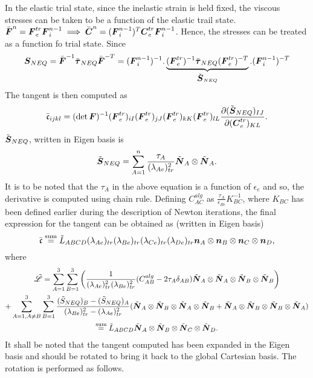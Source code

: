 \documentclass[11pt,twoside,TimesRoman]{article}
\newcommand{\parder}[2]{{\dfrac{\partial #1}{\partial #2}}}
\begin{document}
In the elastic trial state, since the inelastic strain is held fixed, the viscous stresses can be taken to be a function of the elastic trail state. $\bar{\mbox{\boldmath $F$}}^n =\mbox{\boldmath $F$}_e^{tr} \mbox{\boldmath $F$}_i^{n-1} \implies \bar{\mbox{\boldmath $C$}}^n = (\mbox{\boldmath $F$}_i^{n-1})^T \mbox{\boldmath $C$}_e^{tr} \mbox{\boldmath $F$}_i^{n-1}$. Hence, the stresses can be treated as a function fo trial state. Since
\begin{equation}
	 \mbox{\boldmath $S$}_{NEQ}  = \bar{\mbox{\boldmath $F$}}^{-1} \bar{\mbox{\boldmath $\tau$}}_{NEQ} \bar{\mbox{\boldmath $F$}}^{-T} = (\mbox{\boldmath $F$}_i^{n-1})^{-1}.	 \underbrace{(\mbox{\boldmath $F$}_e^{tr})^{-1} \bar{\mbox{\boldmath $\tau$}}_{NEQ} (\mbox{\boldmath $F$}_e^{tr})^{-T}}_{\tilde{\mbox{\boldmath $S$}}_{NEQ}}  .(\mbox{\boldmath $F$}_i^{n-1})^{-T}
\end{equation}
The tangent is then computed as 
\begin{equation}
	\bar{\mathfrak{c}}_{ijkl} = (\det \bfF)^{-1} (\bfF_e^{tr})_{iI} (\bfF_e^{tr})_{jJ} (\bfF_e^{tr})_{kK} (\bfF_e^{tr})_{lL} \parder{(\tilde{\bfS}_{NEQ})_{IJ}}{(\bfC_e^{tr})_{KL}}.
\end{equation}
$\tilde{\mbox{\boldmath $S$}}_{NEQ}$, written in Eigen basis is
\begin{equation}
	\tilde{\mbox{\boldmath $S$}}_{NEQ} = \sum_{A=1}^{n} \frac{\tau_A}{(\lambda_{Ae})_{tr}^2} \tilde{\mbox{\boldmath $N$}}_A \otimes \tilde{\mbox{\boldmath $N$}}_A.
\end{equation}
It is to be noted that the $\tau_A$ in the above equation is a function of $\epsilon_e$ and so, the derivative is computed using chain rule. Defining $C^{alg}_{AC}$ as $\frac{\tau_A}{\epsilon_{Be}} K_{BC}^{-1}$, where $K_{BC}$ has been defined earlier during the description of Newton iterations, the final expression for the tangent can be obtained as (written in Eigen basis)
\begin{equation}
 	\bar{\mathfrak{c}} \stackrel{\text{sum}}{=} \tilde{L}_{ABCD} (\lambda_{Ae})_{tr} (\lambda_{Be})_{tr} (\lambda_{Ce})_{tr} (\lambda_{De})_{tr} \mbox{\boldmath $n$}_A \otimes \mbox{\boldmath $n$}_B \otimes \mbox{\boldmath $n$}_C \otimes \mbox{\boldmath $n$}_D,
\end{equation}
where
\begin{multline}
	\tilde{\mathscr{L}} = \sum_{A=1}^{3}\sum_{B=1}^{3}\left(   \frac{1}{(\lambda_{Ae})_{tr}^2(\lambda_{Be})_{tr}^2} (C^{alg}_{AB} - 2\tau_A \delta_{AB}) \tilde{\mbox{\boldmath $N$}}_A \otimes \tilde{\mbox{\boldmath $N$}}_A \otimes \tilde{\mbox{\boldmath $N$}}_B \otimes \tilde{\mbox{\boldmath $N$}}_B  \right) \\
	+ \sum_{A=1,A\neq B}^{3}\sum_{B=1}^{3}\frac{(\tilde{S}_{NEQ})_B-(\tilde{S}_{NEQ})_A}{(\lambda_{Be})_{tr}^2-(\lambda_{Ae})_{tr}^2}(  \tilde{\mbox{\boldmath $N$}}_A \otimes \tilde{\mbox{\boldmath $N$}}_B \otimes \tilde{\mbox{\boldmath $N$}}_A \otimes \tilde{\mbox{\boldmath $N$}}_B  +  \tilde{\mbox{\boldmath $N$}}_A \otimes \tilde{\mbox{\boldmath $N$}}_B \otimes \tilde{\mbox{\boldmath $N$}}_B \otimes \tilde{\mbox{\boldmath $N$}}_A  ) \\
	\stackrel{\text{sum}}{=}  \tilde{L}_{ABCD}\tilde{\mbox{\boldmath $N$}}_A \otimes \tilde{\mbox{\boldmath $N$}}_B \otimes \tilde{\mbox{\boldmath $N$}}_C \otimes \tilde{\mbox{\boldmath $N$}}_D.
\end{multline}
It shall be noted that the tangent computed has been expanded in the Eigen basis and should be rotated to bring it back to the global Cartesian basis. The rotation is performed as follows.
\end{document}

